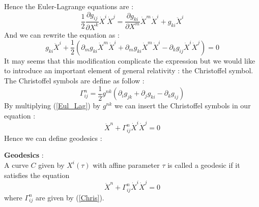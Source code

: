 \documentclass[a4paper,12pt]{article}
\theoremstyle{definition}
\begin{document}
Hence the Euler-Lagrange equations are :
\begin{equation}
	\frac{1}{2}\frac{\partial g_{ij}}{\partial X^k}\dot{X}^i\dot{X}^j=
	\frac{\partial g_{ki}}{\partial X^m}\dot{X}^m\dot{X}^i+g_{ki}\ddot{X}^i
\end{equation}
And we can rewrite the equation as :
\begin{equation}\label{Eul_Lag}
	g_{ki}\ddot{X}^i+\frac{1}{2}(\partial_m g_{ki}\dot{X}^m\dot{X}^i+\partial_m g_{ki}\dot{X}^m\dot{X}^i-\partial_k g_{ij}\dot{X}^i\dot{X}^j)=0
\end{equation}
It may seems that this modification complicate the expression but we would like to introduce an important element of general relativity : the Christoffel symbol.
The Christoffel symbols are define as follow :
\begin{equation}\label{Chris}
	\Gamma^n_{ij}=\frac{1}{2}g^{nk}(\partial_i g_{jk}+\partial_j g_{ki}-\partial_k g_{ij})
\end{equation}
By multiplying (\ref{Eul_Lag}) by $g^{nk}$ we can insert the Christoffel symbols in our equation :
\begin{equation}
	\ddot{X}^n+\Gamma^n_{ij}\dot{X}^i\dot{X}^j=0
\end{equation}
Hence we can define geodesics :
\begin{definition}
	\textbf{Geodesics} :\\
	A curve $C$ given by $X^i(\tau)$ with affine parameter $\tau$ is called a geodesic if it satisfies the equation
	\begin{equation}\label{Geodesic}
		\ddot{X}^n+\Gamma^n_{ij}\dot{X}^i\dot{X}^j=0
	\end{equation}
	where $\Gamma^n_{ij}$ are given by (\ref{Chris}).
\end{definition}
\end{document}
